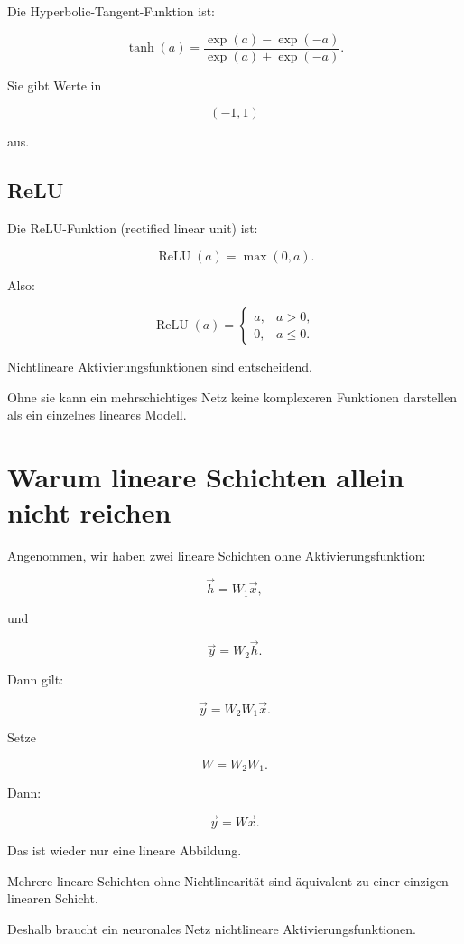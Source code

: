 Die Hyperbolic-Tangent-Funktion ist:

\[
    \tanh(a)
    =
    \frac{\exp(a)-\exp(-a)}
    {\exp(a)+\exp(-a)}.
\]

Sie gibt Werte in

\[
    (-1,1)
\]

aus.

\subsection{ReLU}

Die ReLU-Funktion (rectified linear unit) ist:

\[
    \operatorname{ReLU}(a)
    =
    \max(0,a).
\]

Also:

\[
    \operatorname{ReLU}(a)
    =
    \begin{cases}
        a, & a>0, \\
        0, & a\leq 0.
    \end{cases}
\]

\begin{conceptbox}
Nichtlineare Aktivierungsfunktionen sind entscheidend.

Ohne sie kann ein mehrschichtiges Netz keine komplexeren Funktionen darstellen als ein einzelnes lineares Modell.
\end{conceptbox}

\section{Warum lineare Schichten allein nicht reichen}

Angenommen, wir haben zwei lineare Schichten ohne Aktivierungsfunktion:

\[
    \vec{h}
    =
    W_1\vec{x},
\]

und

\[
    \vec{y}
    =
    W_2\vec{h}.
\]

Dann gilt:

\[
    \vec{y}
    =
    W_2W_1\vec{x}.
\]

Setze

\[
    W
    =
    W_2W_1.
\]

Dann:

\[
    \vec{y}
    =
    W\vec{x}.
\]

Das ist wieder nur eine lineare Abbildung.

\begin{examtipbox}
Mehrere lineare Schichten ohne Nichtlinearität sind äquivalent zu einer einzigen linearen Schicht.

Deshalb braucht ein neuronales Netz nichtlineare Aktivierungsfunktionen.
\end{examtipbox}

